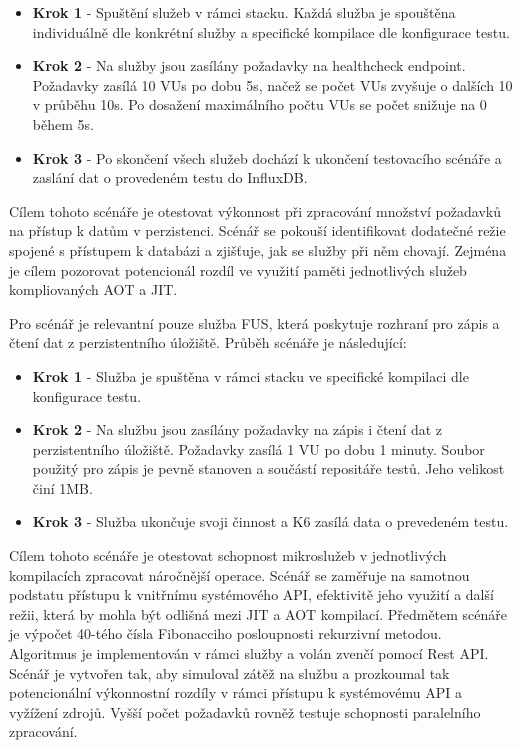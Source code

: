 \begin{itemize}
    \item \textbf{Krok 1} - Spuštění služeb v rámci stacku. Každá služba je spouštěna individuálně dle konkrétní služby a specifické kompilace dle konfigurace testu.
    \item \textbf{Krok 2} - Na služby jsou zasílány požadavky na healthcheck endpoint. Požadavky zasílá 10 VUs po dobu 5s, načež se počet VUs zvyšuje o dalších 10 v průběhu 10s. Po dosažení maximálního počtu VUs se počet snižuje na 0 během 5s.
    \item \textbf{Krok 3} - Po skončení všech služeb dochází k ukončení testovacího scénáře a zaslání dat o provedeném testu do InfluxDB.
\end{itemize}


Cílem tohoto scénáře je otestovat výkonnost při zpracování množství požadavků na přístup k datům v perzistenci. Scénář se pokouší identifikovat dodatečné režie spojené s přístupem k databázi a zjišťuje, jak se služby při něm chovají. Zejména je cílem pozorovat potencionál rozdíl ve využití paměti jednotlivých služeb kompliovaných AOT a JIT.


Pro scénář je relevantní pouze služba FUS, která poskytuje rozhraní pro zápis a čtení dat z perzistentního úložiště. Průběh scénáře je následující:

\begin{itemize}
    \item \textbf{Krok 1} - Služba je spuštěna v rámci stacku ve specifické kompilaci dle konfigurace testu.
    \item \textbf{Krok 2} - Na službu jsou zasílány požadavky na zápis i čtení dat z perzistentního úložiště. Požadavky zasílá 1 VU po dobu 1 minuty. Soubor použitý pro zápis je pevně stanoven a součástí repositáře testů. Jeho velikost činí 1MB.
    \item \textbf{Krok 3} - Služba ukončuje svoji činnost a K6 zasílá data o prevedeném testu.
\end{itemize}


Cílem tohoto scénáře je otestovat schopnost mikroslužeb v jednotlivých kompilacích zpracovat náročnější operace. Scénář se zaměřuje na samotnou podstatu přístupu k vnitřnímu systémového API, efektivitě jeho využití a další režii, která by mohla být odlišná mezi JIT a AOT kompilací. Předmětem scénáře je výpočet 40-tého čísla Fibonacciho posloupnosti rekurzivní metodou. Algoritmus je implementován v rámci služby a volán zvenčí pomocí Rest API. Scénář je vytvořen tak, aby simuloval zátěž na službu a prozkoumal tak potencionální výkonnostní rozdíly v rámci přístupu k systémovému API a vyžížení zdrojů. Vyšší počet požadavků rovněž testuje schopnosti paralelního zpracování.

